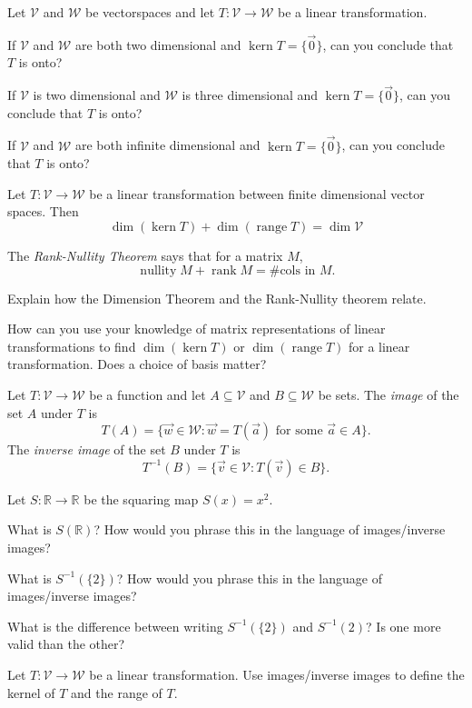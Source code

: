 \documentclass[14pt]{problemset}
\newcommand{\R}{\mathbb{R}}
\newcommand{\Rank}{\operatorname{rank}}
\newcommand{\nnul}{\operatorname{nullity}}
\newcommand{\Kern}{\operatorname{kern}}
\newcommand{\Range}{\operatorname{range}}
\newcommand{\Dim}{\operatorname{dim}}
\begin{document}
	\question
		Let $\mathcal V$ and $\mathcal W$ be vectorspaces and let
		$T:\mathcal V\to\mathcal W$ be a linear transformation.
	\begin{parts}
		\item If $\mathcal V$ and $\mathcal W$ are both two dimensional
			and $\Kern T=\{\vec 0\}$, can you conclude that $T$ is onto?
		\item If $\mathcal V$ is two dimensional and $\mathcal W$ is three dimensional
			and $\Kern T=\{\vec 0\}$, can you conclude that $T$ is onto?
		\item If $\mathcal V$ and $\mathcal W$ are both infinite dimensional
			and $\Kern T=\{\vec 0\}$, can you conclude that $T$ is onto?
	\end{parts}

	\begin{theorem}
		Let $T:\mathcal V\to\mathcal W$ be a linear transformation between finite dimensional
		vector spaces. Then
		\[
			\Dim(\Kern T) + \Dim(\Range T) = \Dim \mathcal V
		\]
	\end{theorem}
	\question
		The \emph{Rank-Nullity Theorem} says that for a matrix $M$, \[\nnul M + \Rank M = \#\text{cols in }M.\]
	\begin{parts}
		\item Explain how the Dimension Theorem and the Rank-Nullity theorem relate.
		\item How can you use your knowledge of matrix representations of linear transformations to 
			find $\Dim (\Kern T)$ or $\Dim (\Range T)$ for a linear transformation. Does a choice 
			of basis matter?
	\end{parts}


	\begin{definition}
		Let $T:\mathcal V\to\mathcal W$ be a function and let $A\subseteq \mathcal V$ and 
		$B\subseteq \mathcal W$ be sets. The \emph{image} of the set $A$ under $T$ is
		\[
			T(A) = \{\vec w\in\mathcal W:\vec w=T(\vec a)\text{ for some }\vec a\in A\}.
		\]
		The \emph{inverse image} of the set $B$ under $T$ is
		\[
			T^{-1}(B) = \{\vec v\in \mathcal V:T(\vec v)\in B\}.
		\]
	\end{definition}

	\question
		Let $S:\R\to\R$ be the squaring map $S(x)=x^2$.
	\begin{parts}
		\item What is $S(\R)$? How would you phrase this in the language of images/inverse images?
		\item What is $S^{-1}(\{2\})$? How would you phrase this in the language of images/inverse images?
		\item What is the difference between writing $S^{-1}(\{2\})$ and $S^{-1}(2)$? Is one more
			valid than the other?
		\item Let $T:\mathcal V\to\mathcal W$ be a linear transformation. Use images/inverse images
			to define the kernel of $T$ and the range of $T$.
	\end{parts}
\end{document}
